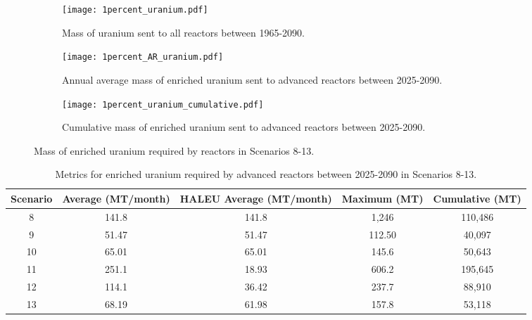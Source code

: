 \begin{figure}[h!]
    \centering
    \begin{subfigure}[b]{0.45\textwidth}
        \centering
        \texttt{[image: 1percent\_uranium.pdf]}
        \caption{Mass of uranium sent to all reactors between 1965-2090.}
        \label{fig:1percent_all_uranium}
    \end{subfigure}
    \hfill
    \begin{subfigure}[b]{0.45\textwidth}
        \centering
        \texttt{[image: 1percent\_AR\_uranium.pdf]}
        \caption{Annual average mass of enriched uranium sent to 
        advanced reactors between 2025-2090.}
        \label{fig:1percent_AR_uranium}
    \end{subfigure}
    \begin{subfigure}[b]{0.45\textwidth}
        \centering
        \texttt{[image: 1percent\_uranium\_cumulative.pdf]}
        \caption{Cumulative mass of enriched uranium sent to advanced reactors 
        between 2025-2090.}
        \label{fig:1percent_uranium_cumulative}
    \end{subfigure}
       \caption{Mass of enriched uranium required by reactors
        in Scenarios 8-13.}
       \label{fig:1percent_uranium}
\end{figure}

\begin{table}[h!]
    \centering 
    \caption{Metrics for enriched uranium required by advanced reactors 
    between 2025-2090 in Scenarios 8-13.}
    \label{tab:1percent_uranium}
    \begin{tabular}{c c c c c}
        \hline
        Scenario & Average (MT/month) & \gls{HALEU} Average  
        (MT/month) & Maximum (MT) & Cumulative (MT)\\\hline
        8 & 141.8 & 141.8 & 1,246 & 110,486\\
        9 & 51.47 & 51.47 & 112.50 & 40,097\\
        10 & 65.01 & 65.01 & 145.6 & 50,643\\
        11 & 251.1 & 18.93 & 606.2 & 195,645\\
        12 & 114.1 & 36.42 & 237.7 & 88,910\\
        13 & 68.19 & 61.98 & 157.8 & 53,118\\
        \hline
    \end{tabular}
\end{table}

